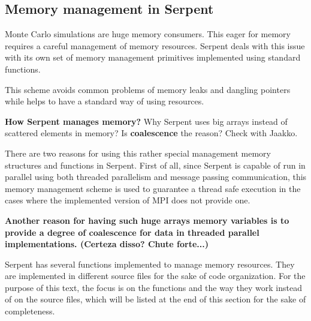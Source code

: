 \documentclass[twoside,a4paper,12pt,english]{anstrans}
\begin{document}
\subsection{Memory management in Serpent}

Monte Carlo simulations are huge memory consumers. This eager for memory requires a careful
management of memory resources. Serpent deals with this issue with its own set of memory
management primitives implemented using standard functions.

This scheme avoids common problems of memory leaks and dangling pointers while helps to
have a standard way of using resources.

\textbf{How Serpent manages memory?}
Why Serpent uses big arrays instead of scattered elements in memory?
Is \textbf{coalescence} the reason? Check with Jaakko.

There are two reasons for using this rather special management memory
structures and functions in Serpent. First of all, since Serpent is
capable of run in parallel using both threaded parallelism and
message passing communication, this memory management scheme is
used to guarantee a thread safe execution in the cases where
the implemented version of MPI does not provide one.

\textbf{Another reason for having such huge arrays memory variables is to
provide a degree of coalescence for data in threaded parallel implementations.
(Certeza disso? Chute forte...)}

%

Serpent has several functions implemented to manage memory resources. They are implemented in different
source files for the sake of code organization. For the purpose of this text, the focus is on the functions
and the way they work instead of on the source files, which will be listed at the end of this section for
the sake of completeness.
\end{document}
